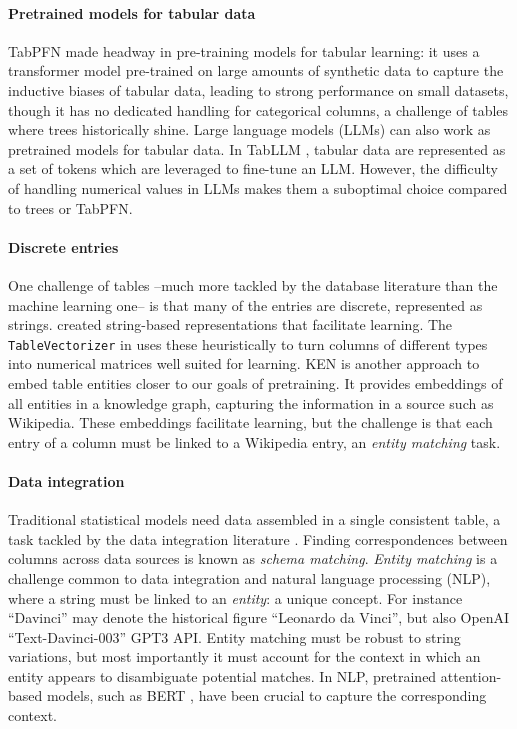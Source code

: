 \documentclass{article}
\theoremstyle{plain}
\theoremstyle{definition}
\theoremstyle{remark}
\begin{document}
\paragraph{Pretrained models for tabular data} 
TabPFN \citep{hollmannTabPFNTransformerThat2023} made headway in pre-training models for tabular learning: it uses a transformer model pre-trained on large amounts of synthetic data to capture the inductive biases of tabular data, leading to strong performance on small datasets, though it has no dedicated handling for categorical columns, a challenge of tables where trees historically shine. Large language models (LLMs) can also work as pretrained models for tabular data. In TabLLM \citep{hegselmannTabLLMFewshotClassification2023}, tabular data are represented as a set of tokens which are leveraged to fine-tune an LLM. However, the difficulty of handling numerical values in LLMs makes them a suboptimal choice compared to trees or TabPFN.

\paragraph{Discrete entries}
One challenge of tables --much more tackled by the database literature than the machine learning one-- is that many of the entries are discrete, represented as strings. \citet{cerdaEncodingHighcardinalityString2022} created string-based representations that facilitate learning. The {\tt TableVectorizer} in \citet{skrub2024} uses these heuristically to turn columns of different types into numerical matrices well suited for learning.
 KEN \citep{cvetkov2023relational} is another approach to embed table entities closer to our goals of pretraining. It provides embeddings of all entities in a knowledge graph, capturing the information in a source such as Wikipedia. These embeddings facilitate learning, but the challenge is that each entry of a column must be linked to a Wikipedia entry, an \emph{entity matching} task.

\paragraph{Data integration} Traditional statistical models need data assembled in a single consistent table, a task tackled by the data integration literature \citep{doan2012principles}. Finding correspondences between columns across data sources is known as \emph{schema matching}. \emph{Entity matching} is a challenge common to data integration and natural language processing (NLP), where a string must be linked to an \emph{entity}: a unique concept. For instance ``Davinci'' may denote the historical figure ``Leonardo da Vinci'', but also OpenAI ``Text-Davinci-003'' GPT3 API. Entity matching must be robust to string variations, but most importantly it must account for the context in which an entity appears to disambiguate potential matches. In NLP, pretrained attention-based models, such as BERT \citep{devlinBERTPretrainingDeep2019}, have been crucial to capture the corresponding context.
\end{document}
